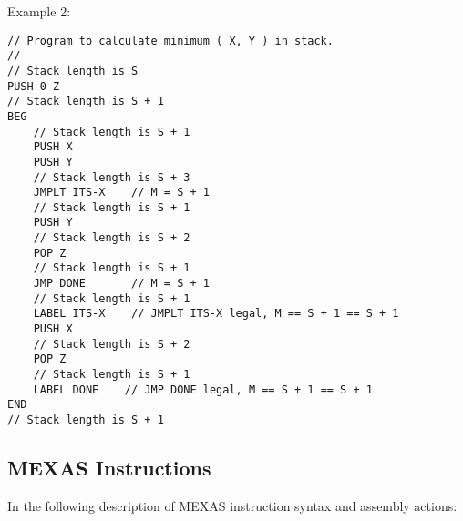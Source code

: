 \documentclass[12pt]{article}
\newenvironment{indpar}[1][0.3in]%
	{\begin{list}{}%
		     {\setlength{\itemsep}{0in}%
		      \setlength{\topsep}{0in}%
		      \setlength{\parsep}{1ex}%
		      \setlength{\labelwidth}{#1}%
		      \setlength{\leftmargin}{#1}%
		      \addtolength{\leftmargin}{\labelsep}}%
	 \item}%
	{\end{list}}
\begin{document}
Example 2:
\begin{indpar}\begin{verbatim}
// Program to calculate minimum ( X, Y ) in stack.
//
// Stack length is S
PUSH 0 Z
// Stack length is S + 1
BEG
    // Stack length is S + 1
    PUSH X
    PUSH Y
    // Stack length is S + 3
    JMPLT ITS-X    // M = S + 1
    // Stack length is S + 1
    PUSH Y
    // Stack length is S + 2
    POP Z
    // Stack length is S + 1
    JMP DONE       // M = S + 1
    // Stack length is S + 1
    LABEL ITS-X    // JMPLT ITS-X legal, M == S + 1 == S + 1
    PUSH X
    // Stack length is S + 2
    POP Z
    // Stack length is S + 1
    LABEL DONE    // JMP DONE legal, M == S + 1 == S + 1
END
// Stack length is S + 1
\end{verbatim}\end{indpar}



\subsection{MEXAS Instructions}
\label{MEXAS-INSTRUCTIONS}

In the following description of MEXAS instruction syntax and
assembly actions:
\end{document}
